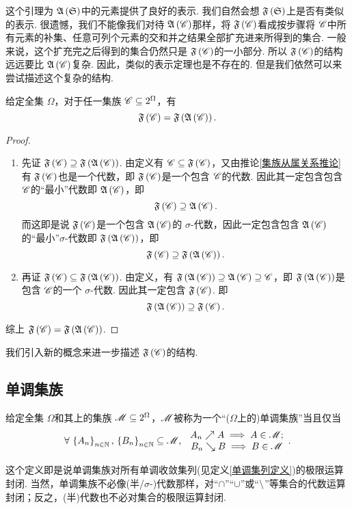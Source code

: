 这个引理为 $\mfA\z(\mfS\y)$中的元素提供了良好的表示. 我们自然会想 $\mfF\z(\mfS\y)$上是否有类似的表示. 很遗憾，我们不能像我们对待 $\mfA\z(\msC\y)$那样，将 $\mfF\z(\msC\y)$看成按步骤将 $\msC$中所有元素的补集、任意可列个元素的交和并之结果全部扩充进来所得到的集合. 一般来说，这个扩充完之后得到的集合仍然只是 $\mfF\z(\msC\y)$的一小部分. 所以 $\mfF\z(\msC\y)$的结构远远要比 $\mfA\z(\msC\y)$复杂. 因此，类似的表示定理也是不存在的. 但是我们依然可以来尝试描述这个复杂的结构.
\vspace{0.5cm}

\begin{proposition}\label{集族扩张命题}
    给定全集 $\Omega$，对于任一集族 $\msC\sb\pws{\Omega}$，有
    \[\mfF\z(\msC\y)=\mfF\z( \mfA\z( \msC \y) \y).\]
\end{proposition}
\begin{proof}
    \begin{enumerate}
        \item 先证 $\mfF\z(\msC\y)\sp\mfF\z( \mfA\z( \msC \y) \y)$. 由定义有 $\msC\sb\mfF\z(\msC\y)$，又由推论\ref{集族从属关系推论}有 $\mfF\z(\msC\y)$也是一个代数，即 $\mfF\z(\msC\y)$是一个包含 $\msC$的代数. 因此其一定包含包含 $\msC$的“最小”代数即 $\mfA\z(\msC\y)$，即
        \[ \mfF\z(\msC\y)\sp\mfA\z(\msC\y). \]
        而这即是说 $\mfF\z(\msC\y)$是一个包含 $\mfA\z(\msC\y)$的 $\sigma$-代数，因此一定包含包含 $\mfA\z(\msC\y)$的“最小”$\sigma$-代数即 $\mfF\z(\mfA\z(\msC\y)\y)$，即
        \[   \mfF\z(\msC\y)\sp\mfF\z( \mfA\z( \msC \y) \y).   \]
        \item 再证 $\mfF\z(\msC\y)\sb\mfF\z( \mfA\z( \msC \y) \y)$. 由定义，有 $\mfF\z(\mfA\z(\msC\y)\y)\sp\mfA\z(\msC\y)\sp\msC$，即 $\mfF\z(\mfA\z(\msC\y)\y)$是包含 $\msC$的一个 $\sigma$-代数. 因此其一定包含 $\mfF\z(\msC\y)$. 即
        \[ \mfF\z(\mfA\z(\msC\y)\y)\sp\mfF\z(\msC\y). \]
    \end{enumerate}
    综上 $\mfF\z(\msC\y)=\mfF\z( \mfA\z( \msC \y) \y)$.
\end{proof}
\vspace{0.5cm}
我们引入新的概念来进一步描述 $\mfF\z(\msC\y)$的结构.

\subsection{单调集族}

\begin{definition}[单调集族]
    给定全集 $\Omega$和其上的集族 $\msM\sb\pws{\Omega}$，$\msM$被称为一个“($\Omega$上的)单调集族”当且仅当
    \[   \forall\,\z\{A_n\y\}_{n\in\N},\,\z\{B_n\y\}_{n\in\N}\sb\msM,\;\begin{array}{c}
        A_n\nearrow A\implies A\in\msM; \\
        B_n \searrow B\implies B\in\msM
    \end{array}.   \]
\end{definition}
\begin{remark}
    这个定义即是说单调集族对所有单调收敛集列(见定义\ref{单调集列定义})的极限运算封闭. 当然，单调集族不必像(半/$\sigma$-)代数那样，对“$\cap$”“$\cup$”或“$\m$”等集合的代数运算封闭；反之，(半)代数也不必对集合的极限运算封闭.
\end{remark}
\vspace{0.5cm}

